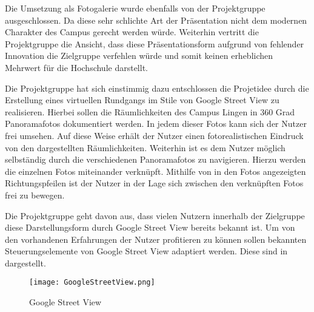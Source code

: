 Die Umsetzung als Fotogalerie wurde ebenfalls von der Projektgruppe 
ausgeschlossen. Da diese sehr schlichte Art der Präsentation nicht dem modernen
Charakter des Campus gerecht werden würde. Weiterhin vertritt die Projektgruppe
die Ansicht, dass diese Präsentationsform aufgrund von fehlender Innovation die
Zielgruppe verfehlen würde und somit keinen erheblichen Mehrwert für die
Hochschule darstellt.

Die Projektgruppe hat sich einstimmig dazu entschlossen die Projetidee durch die
Erstellung eines virtuellen Rundgangs im Stile von Google Street View zu
realisieren. Hierbei sollen die Räumlichkeiten des Campus Lingen in 360 Grad
Panoramafotos dokumentiert werden. In jedem dieser Fotos kann sich der Nutzer
frei umsehen. Auf diese Weise erhält der Nutzer einen fotorealistischen Eindruck
von den dargestellten Räumlichkeiten. Weiterhin ist es dem Nutzer möglich
selbständig durch die verschiedenen Panoramafotos zu navigieren. Hierzu werden
die einzelnen Fotos miteinander verknüpft. Mithilfe von in den Fotos
angezeigten Richtungspfeilen ist der Nutzer in der Lage sich zwischen
den verknüpften Fotos frei zu bewegen. 

Die Projektgruppe geht davon aus, dass vielen Nutzern innerhalb der Zielgruppe
diese Darstellungsform durch Google Street View bereits bekannt ist. Um von den
vorhandenen Erfahrungen der Nutzer profitieren zu können sollen bekannten
Steuerungselemente von Google Street View adaptiert werden. Diese sind in
 dargestellt.

\begin{figure}[htb] 
\centering
\texttt{[image: GoogleStreetView.png]}
\caption[Google Street View]{Google Street View\protect\footnotemark}
\label{fig:GoogleStreetView}
\end{figure}
